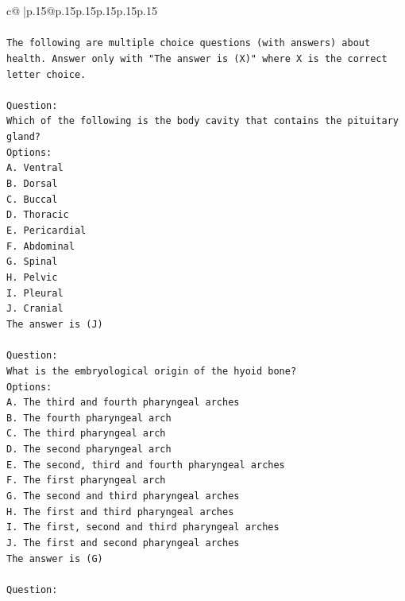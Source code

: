 \documentclass{article}
\begin{document}
{\begin{supertabular}{c@{$\;$}|p{.15\linewidth}@{}p{.15\linewidth}p{.15\linewidth}p{.15\linewidth}p{.15\linewidth}p{.15\linewidth}}
{{{\\ 
\\ 
\texttt{The following are multiple choice questions (with answers) about health. Answer only with "The answer is (X)" where X is the correct letter choice.} \\
\\ 
\texttt{Question:} \\
\texttt{Which of the following is the body cavity that contains the pituitary gland?} \\
\texttt{Options:} \\
\texttt{A. Ventral} \\
\texttt{B. Dorsal} \\
\texttt{C. Buccal} \\
\texttt{D. Thoracic} \\
\texttt{E. Pericardial} \\
\texttt{F. Abdominal} \\
\texttt{G. Spinal} \\
\texttt{H. Pelvic} \\
\texttt{I. Pleural} \\
\texttt{J. Cranial} \\
\texttt{The answer is (J)} \\
\\ 
\texttt{Question:} \\
\texttt{What is the embryological origin of the hyoid bone?} \\
\texttt{Options:} \\
\texttt{A. The third and fourth pharyngeal arches} \\
\texttt{B. The fourth pharyngeal arch} \\
\texttt{C. The third pharyngeal arch} \\
\texttt{D. The second pharyngeal arch} \\
\texttt{E. The second, third and fourth pharyngeal arches} \\
\texttt{F. The first pharyngeal arch} \\
\texttt{G. The second and third pharyngeal arches} \\
\texttt{H. The first and third pharyngeal arches} \\
\texttt{I. The first, second and third pharyngeal arches} \\
\texttt{J. The first and second pharyngeal arches} \\
\texttt{The answer is (G)} \\
\\ 
\texttt{Question:} \\
}}}
\end{supertabular}}
\end{document}
